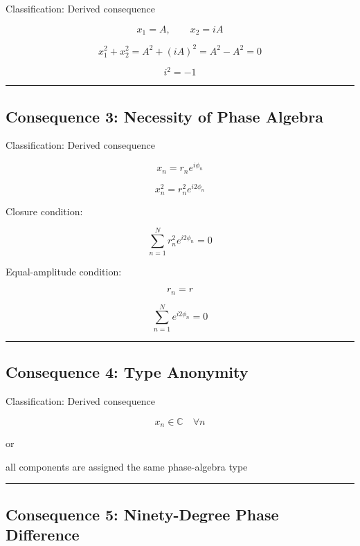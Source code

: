 \documentclass[
  a4paper,
]{article}
\newenvironment{Shaded}{}{}
\newcommand{\NormalTok}[1]{#1}
\begin{document}
Classification: Derived consequence

\[
x_1=A,\qquad x_2=iA
\]

\[
x_1^2+x_2^2=A^2+(iA)^2=A^2-A^2=0
\]

\[
i^2=-1
\]

\begin{center}\rule{0.5\linewidth}{0.5pt}\end{center}

\subsection{Consequence 3: Necessity of Phase
Algebra}\label{consequence-3-necessity-of-phase-algebra}

Classification: Derived consequence

\[
x_n=r_n e^{i\phi_n}
\]

\[
x_n^2=r_n^2e^{i2\phi_n}
\]

Closure condition:

\[
\sum_{n=1}^{N}r_n^2e^{i2\phi_n}=0
\]

Equal-amplitude condition:

\[
r_n=r
\]

\[
\sum_{n=1}^{N}e^{i2\phi_n}=0
\]

\begin{center}\rule{0.5\linewidth}{0.5pt}\end{center}

\subsection{Consequence 4: Type
Anonymity}\label{consequence-4-type-anonymity}

Classification: Derived consequence

\[
x_n\in\mathbb{C}\quad\forall n
\]

or

\begin{Shaded}
\begin{Highlighting}[]
\NormalTok{all components are assigned the same phase{-}algebra type}
\end{Highlighting}
\end{Shaded}

\begin{center}\rule{0.5\linewidth}{0.5pt}\end{center}

\subsection{Consequence 5: Ninety-Degree Phase
Difference}\label{consequence-5-ninety-degree-phase-difference}
\end{document}
